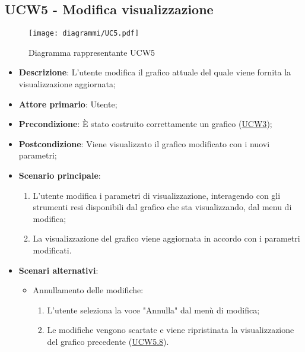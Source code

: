 \subsection{UCW5 - Modifica visualizzazione}
\label{sub:ucw5}

\begin{figure}[h]
    \centering
    \texttt{[image: diagrammi/UC5.pdf]}
    \caption{Diagramma rappresentante UCW5}
    \label{fig:UCW5}
\end{figure}


\begin{itemize}
    \item \textbf{Descrizione}: L’utente modifica il grafico attuale del quale viene fornita la visualizzazione
          aggiornata;

    \item \textbf{Attore primario}: Utente;

    \item \textbf{Precondizione}:   È stato costruito correttamente un grafico (\hyperref[sub:ucw3]{UCW3});

    \item \textbf{Postcondizione}:  Viene visualizzato il grafico modificato con i nuovi parametri;

    \item \textbf{Scenario principale}:
          \begin{enumerate}
              \item L'utente modifica i parametri di visualizzazione, interagendo con gli strumenti resi disponibili dal
                    grafico che sta visualizzando, dal menu di modifica;
              \item La visualizzazione del grafico viene aggiornata in accordo con i parametri modificati.
          \end{enumerate}

    \item \textbf{Scenari alternativi}:
          \begin{itemize}
              \item Annullamento delle modifiche:
                    \begin{enumerate}
                        \item L'utente seleziona la voce "Annulla" dal menù di modifica;
                        \item Le modifiche vengono scartate e viene ripristinata la visualizzazione del grafico precedente
                              (\hyperref[ssub:ucw5.8]{UCW5.8}).
                    \end{enumerate}
          \end{itemize}

\end{itemize}


